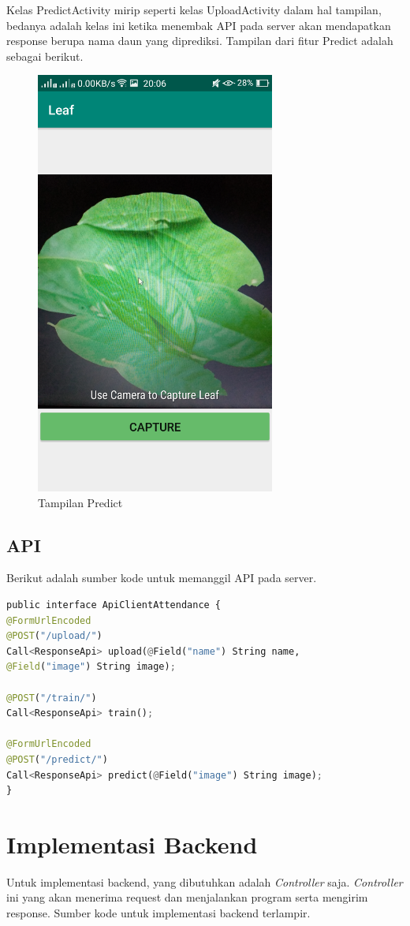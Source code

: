 \par Kelas PredictActivity mirip seperti kelas UploadActivity dalam hal tampilan, bedanya adalah kelas ini ketika menembak API pada server akan mendapatkan response berupa nama daun yang diprediksi. Tampilan dari fitur Predict adalah sebagai berikut.
\begin{figure}[H]
	\centering\includegraphics[width=0.7\textwidth]{bab4/figures/predict.png}
	\caption{Tampilan Predict}
	\label{fig:predict}
\end{figure}
\subsection{API}
\par Berikut adalah sumber kode untuk memanggil API pada server.

\begin{lstlisting}[language=python, caption=Pemanggilan API menggunakan Retrofit2, label=code:api, firstnumber=0]
public interface ApiClientAttendance {
@FormUrlEncoded
@POST("/upload/")
Call<ResponseApi> upload(@Field("name") String name,
@Field("image") String image);

@POST("/train/")
Call<ResponseApi> train();

@FormUrlEncoded
@POST("/predict/")
Call<ResponseApi> predict(@Field("image") String image);
}
\end{lstlisting}

\section{Implementasi Backend}
Untuk implementasi backend, yang dibutuhkan adalah \textit{Controller} saja. \textit{Controller} ini yang akan menerima request dan menjalankan program serta mengirim response.
Sumber kode untuk implementasi backend terlampir.